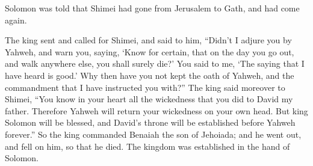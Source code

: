 {Solomon was told that Shimei had gone from Jerusalem to Gath, and had come again.
\par }{\PP {}The king sent and called for Shimei, and said to him, “Didn’t I adjure you by Yahweh, and warn you, saying, ‘Know for certain, that on the day you go out, and walk anywhere else, you shall surely die?’ You said to me, ‘The saying that I have heard is good.’
Why then have you not kept the oath of Yahweh, and the commandment that I have instructed you with?”
The king said moreover to Shimei, “You know in your heart all the wickedness that you did to David my father. Therefore Yahweh will return your wickedness on your own head.
But king Solomon will be blessed, and David’s throne will be established before Yahweh forever.”
So the king commanded Benaiah the son of Jehoiada; and he went out, and fell on him, so that he died. The kingdom was established in the hand of Solomon.

}
